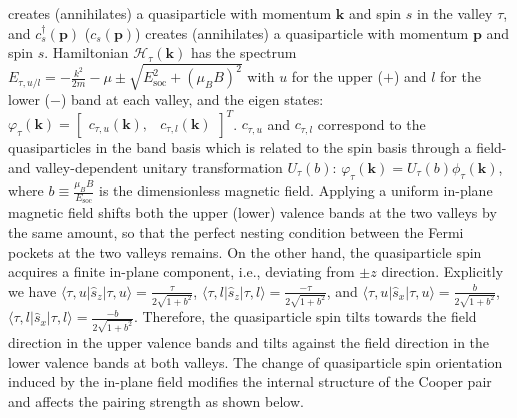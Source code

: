 creates (annihilates) a quasiparticle with momentum $\mathbf{k}$
and spin $s$ in the valley $\tau$, and $c_{s}^{\dagger}(\mathbf{p})$
($c_{s}(\mathbf{p})$) creates (annihilates) a quasiparticle with
momentum $\mathbf{p}$ and spin $s$.
Hamiltonian $\mathcal{H}_{\tau}(\mathbf{k})$
has the spectrum $E_{\tau,u/l}=-\frac{k^{2}}{2m}-\mu\pm\sqrt{E_{\text{soc}}^{2}+\left(\mu_{B}B\right)^{2}}$
with $u$ for the upper ($+$) and $l$ for the lower ($-$) band
at each valley, and the eigen states: $\varphi_{\tau}(\mathbf{k})=\left[\begin{array}{cc}
c_{\tau,u}(\mathbf{k}), & c_{\tau,l}(\mathbf{k})\end{array}\right]^{T}$.
$c_{\tau,u}$ and $c_{\tau,l}$ correspond to the quasiparticles
in the band basis which is related to the spin basis through a field-
and valley-dependent unitary transformation $U_{\tau}(b)$: $\varphi_{\tau}(\mathbf{k})=U_{\tau}(b)\phi_{\tau}(\mathbf{k})$,
where $b\equiv\frac{\mu_{B}B}{E_{\text{soc}}}$ is the dimensionless magnetic field.
Applying a uniform in-plane magnetic field shifts both the
upper (lower) valence bands at the two valleys
by the same amount, so that the perfect nesting condition between
the Fermi pockets at the two valleys remains.
On the other hand, the quasiparticle spin acquires a finite in-plane component,
i.e., deviating from $\pm z$ direction.
Explicitly we have $\langle\tau,u\left|\hat{s}_{z}\right|\tau,u\rangle=\frac{\tau}{2\sqrt{1+b^{2}}}$,
$\langle\tau,l\left|\hat{s}_{z}\right|\tau,l\rangle=\frac{-\tau}{2\sqrt{1+b^{2}}}$,
and $\langle\tau,u\left|\hat{s}_{x}\right|\tau,u\rangle=\frac{b}{2\sqrt{1+b^{2}}}$,
$\langle\tau,l\left|\hat{s}_{x}\right|\tau,l\rangle=\frac{-b}{2\sqrt{1+b^{2}}}$.
Therefore, the quasiparticle spin tilts towards the field direction
in the upper valence bands and tilts against the field direction in
the lower valence bands at both valleys.
The change of quasiparticle spin orientation induced by the in-plane field modifies the internal
structure of the Cooper pair and affects the pairing strength as shown below.


